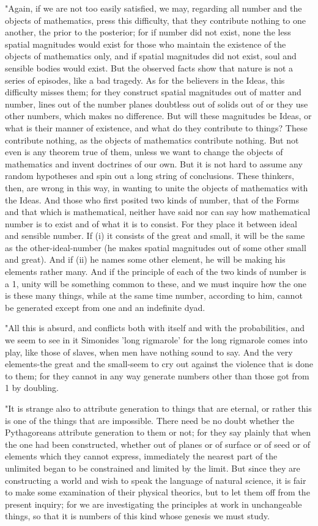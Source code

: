 "Again, if we are not too easily satisfied, we may, regarding all
number and the objects of mathematics, press this difficulty, that
they contribute nothing to one another, the prior to the posterior;
for if number did not exist, none the less spatial magnitudes would
exist for those who maintain the existence of the objects of mathematics
only, and if spatial magnitudes did not exist, soul and sensible bodies
would exist. But the observed facts show that nature is not a series
of episodes, like a bad tragedy. As for the believers in the Ideas,
this difficulty misses them; for they construct spatial magnitudes
out of matter and number, lines out of the number planes doubtless
out of solids out of or they use other numbers, which makes no difference.
But will these magnitudes be Ideas, or what is their manner of existence,
and what do they contribute to things? These contribute nothing, as
the objects of mathematics contribute nothing. But not even is any
theorem true of them, unless we want to change the objects of mathematics
and invent doctrines of our own. But it is not hard to assume any
random hypotheses and spin out a long string of conclusions. These
thinkers, then, are wrong in this way, in wanting to unite the objects
of mathematics with the Ideas. And those who first posited two kinds
of number, that of the Forms and that which is mathematical, neither
have said nor can say how mathematical number is to exist and of what
it is to consist. For they place it between ideal and sensible number.
If (i) it consists of the great and small, it will be the same as
the other-ideal-number (he makes spatial magnitudes out of some other
small and great). And if (ii) he names some other element, he will
be making his elements rather many. And if the principle of each of
the two kinds of number is a 1, unity will be something common to
these, and we must inquire how the one is these many things, while
at the same time number, according to him, cannot be generated except
from one and an indefinite dyad. 

"All this is absurd, and conflicts both with itself and with the probabilities,
and we seem to see in it Simonides 'long rigmarole' for the long rigmarole
comes into play, like those of slaves, when men have nothing sound
to say. And the very elements-the great and the small-seem to cry
out against the violence that is done to them; for they cannot in
any way generate numbers other than those got from 1 by doubling.

"It is strange also to attribute generation to things that are eternal,
or rather this is one of the things that are impossible. There need
be no doubt whether the Pythagoreans attribute generation to them
or not; for they say plainly that when the one had been constructed,
whether out of planes or of surface or of seed or of elements which
they cannot express, immediately the nearest part of the unlimited
began to be constrained and limited by the limit. But since they are
constructing a world and wish to speak the language of natural science,
it is fair to make some examination of their physical theorics, but
to let them off from the present inquiry; for we are investigating
the principles at work in unchangeable things, so that it is numbers
of this kind whose genesis we must study. 

